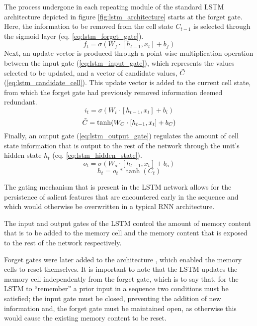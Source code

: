 \documentclass[../../fyp.tex]{subfiles}
\begin{document}
The process undergone in each repeating module of the standard LSTM architecture depicted in figure \ref{fig:lstm_architecture} starts at the forget gate. Here, the information to be removed from the cell state $C_{t-1}$ is selected through the sigmoid layer (eq. \ref{eq:lstm_forget_gate}).
\begin{equation} \label{eq:lstm_forget_gate}
	f_t = \sigma(W_f\cdot[h_{t-1},x_t] + b_f)
\end{equation}
Next, an update vector is produced through a point-wise multiplication operation between the input gate (\ref{eq:lstm_input_gate}), which represents the values selected to be updated, and a vector of candidate values, $\Tilde{C}$ (\ref{eq:lstm_candidate_cell}). This update vector is added to the current cell state, from which the forget gate had previously removed information deemed redundant.
\begin{equation} \label{eq:lstm_input_gate}
	i_t = \sigma(W_i\cdot[h_{t-1},x_t] + b_i)
\end{equation}
\begin{equation} \label{eq:lstm_candidate_cell}
	\Tilde{C} = \tanh(W_C\cdot[h_{t-1},x_t] + b_C)
\end{equation}
Finally, an output gate (\ref{eq:lstm_output_gate}) regulates the amount of cell state information that is output to the rest of the network through the unit's hidden state $h_t$ (eq. \ref{eq:lstm_hidden_state}).
\begin{equation} \label{eq:lstm_output_gate}
	o_t = \sigma(W_o\cdot[h_{t-1},x_t] + b_o)
\end{equation}
\begin{equation} \label{eq:lstm_hidden_state}
	h_t = o_t*\tanh(C_t)
\end{equation}

The gating mechanism that is present in the LSTM network allows for the persistence of salient features that are encountered early in the sequence and which would otherwise be overwritten in a typical RNN architecture.

The input and output gates of the LSTM control the amount of memory content that is to be added to the memory cell and the memory content that is exposed to the rest of the network respectively.

Forget gates were later added to the architecture \citep{gers2000}, which enabled the memory cells to reset themselves. It is important to note that the LSTM updates the memory cell independently from the forget gate, which is to say that, for the LSTM to \enquote{remember} a prior input in a sequence two conditions must be satisfied; the input gate must be closed, preventing the addition of new information and, the forget gate must be maintained open, as otherwise this would cause the existing memory content to be reset.
\end{document}
